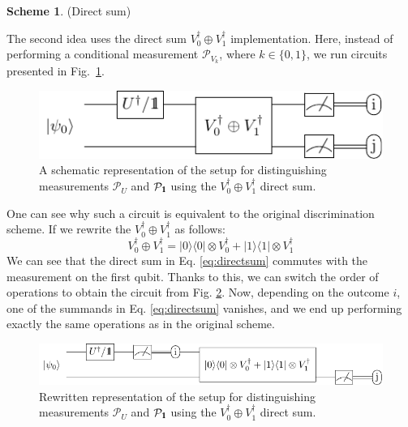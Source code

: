\documentclass[preprint,12pt, a4paper, dvipsnames]{elsarticle}
\newcommand{\ket}[1]{\ensuremath{|#1\rangle}}
\newcommand{\bra}[1]{\ensuremath{\langle#1|}}
\newcommand{\ketbra}[2]{\ensuremath{\ket{#1}\bra{#2}}}
\newcommand{\proj}[1]{\ensuremath{\ketbra{#1}{#1}}}
\newcommand{\1}{{\rm 1\hspace{-0.9mm}l}}
\newcommand{\Id}{{\rm 1\hspace{-0.9mm}l}}
\newcommand{\PP}{\mathcal{P}}
\theoremstyle{definition}
\newtheorem{scheme}{Scheme}
\begin{document}
\begin{scheme}(Direct sum)

The second idea uses the direct sum $V_0^\dagger \oplus V_1^\dagger$ implementation.     Here, instead of performing a conditional
measurement $\PP_{V_k}$, where $k\in \{0,1\}$,  we run circuits presented in
Fig.~\ref{fig:controlled}.

	\begin{figure}[h!]
		\centering
		\includegraphics[scale=1.5]{pics/controlled_unitary}

		\caption{ A schematic representation of the setup for distinguishing
			measurements $\PP_{U}$ and $\PP_{\Id}$ using the $V_0^\dagger \oplus V_1^\dagger$ direct sum.
		}\label{fig:controlled}
	\end{figure}

	One can see why such a circuit is equivalent to the original discrimination scheme.
	If we rewrite the $V_0^\dagger \oplus V_1^\dagger$ as follows:
	\begin{equation}
		\label{eq:directsum}
		V_0^\dagger \oplus V_1^\dagger = \proj{0}\otimes V_0^\dagger + \proj{1} \otimes V_1^\dagger
	\end{equation}
	We can see that the direct sum in Eq. \eqref{eq:directsum} commutes with the measurement on the
	first qubit. Thanks to this, we can switch the order of operations to obtain the circuit from
	Fig. \ref{fig:directsum}. Now, depending on the outcome $i$, one of the summands in
	Eq. \eqref{eq:directsum} vanishes, and we end up performing exactly the same operations as in the
	original scheme.

	\begin{figure}[h!]
		\centering
		\includegraphics[width=\textwidth]{pics/direct_sum}
		\caption{Rewritten representation of the setup for distinguishing
		measurements $\PP_{U}$ and $\PP_{\Id}$ using the $V_0^\dagger \oplus V_1^\dagger$ direct
		sum.
		}\label{fig:directsum}
	\end{figure}


\end{scheme}
\end{document}
